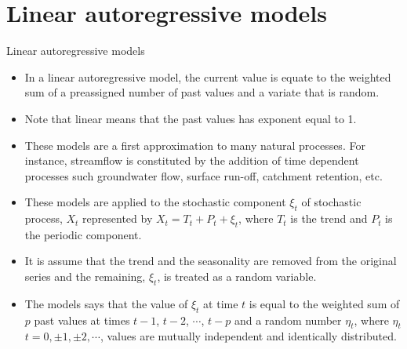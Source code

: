 \documentclass[8pt]{beamer}
\renewcommand{\emph}[1]{\textcolor{myorange}{#1}}
\begin{document}
\section{Linear autoregressive models}
\begin{frame}{Linear autoregressive models}
    \begin{itemize}
        \item In a \alert{linear autoregressive model}, the \emph{current value} is equate to the \emph{weighted sum} of a preassigned number of \emph{past values} and a variate that is \emph{random}. 
        \item Note that \emph{linear} means that the past values has exponent equal to 1. 
        \item These models are a first approximation to many \emph{natural processes}. For instance, \emph{streamflow} is constituted by the addition of time dependent processes such \emph{groundwater flow}, \emph{surface run-off}, \emph{catchment retention}, etc.  
        \item These models are applied to the \emph{stochastic component} $\xi_t$ of \emph{stochastic process}, $X_t$ represented by $X_t = T_t + P_t + \xi_t$, where $T_t$ is the \emph{trend} and $P_t$ is the \emph{periodic} component.
        \item It is assume that the \emph{trend} and the \emph{seasonality} are removed from the original series and the remaining, $\xi_t$, is treated as a \emph{random variable}.
        \item The models says that the value of $\xi_t$ at time $t$ is equal to the weighted sum of $p$ past values at times $t-1$, $t-2$, $\cdots$, $t-p$ and a random number $\eta_t$, where $\eta_t$ $t=0, \pm 1, \pm2, \cdots$, values are mutually independent and identically distributed.  
    \end{itemize}
\end{frame}
\end{document}
